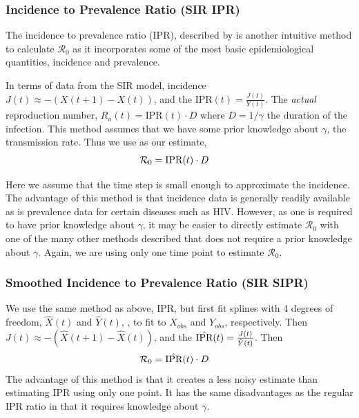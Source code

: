 \documentclass[12pt]{article}
\newcommand{\rr}{\ensuremath{\mathcal{R}_0}}
\begin{document}
\subsubsection{Incidence to Prevalence
  Ratio (SIR IPR)}\label{incidence-to-prevalence-ratio}
The incidence to prevalence ratio (IPR), described by \cite{Nishiura2009} is another intuitive method to calculate $\rr$ as it incorporates some of the most basic epidemiological quantities, incidence and prevalence.

In terms of data from the SIR model, incidence $J(t) \approx -(X(t+1) - X(t))$, and the IPR$(t) = \frac{J(t)}{Y(t)}$. The \textit{actual} reproduction number, $R_a(t) = \text{IPR}(t)\cdot D$ where $D = 1 /\gamma$ the duration of the infection.  This method assumes that we have some prior knowledge about $\gamma$, the transmission rate.  Thus we use as our estimate,
\begin{align*}
\rr &= \textnormal{IPR}(t) \cdot D
\end{align*}

Here we assume that the time step is small enough to approximate the incidence.  The advantage of this method is that incidence data is generally readily available as is prevalence data for certain diseases such as HIV.  However, as one is required to have prior knowledge about $\gamma$, it may be easier to directly estimate $\rr$ with one of the many other methods described that does not require a prior knowledge about $\gamma$.  Again, we are using only one time point to estimate $\rr$.

\subsubsection{Smoothed Incidence to Prevalence Ratio (SIR SIPR)}
We use the same method as above, IPR, but first fit splines with 4 degrees of freedom, $\hat{X}(t)$ and $\hat{Y}(t)$, , to fit to $X_{obs}$ and $Y_{obs}$, respectively.  Then  $J(t) \approx -(\hat{X}(t+1) - \hat{X}(t))$, and the $\hat{\textnormal{IPR}}(t) = \frac{J(t)}{\hat{Y}(t)}$.  Then
\begin{align*}
\rr &= \hat{\textnormal{IPR}}(t) \cdot D
\end{align*}
The advantage of this method is that it creates a less noisy estimate than estimating IPR using only one point.  It has the same disadvantages as the regular IPR ratio in that it requires knowledge about $\gamma$.

\end{document}
